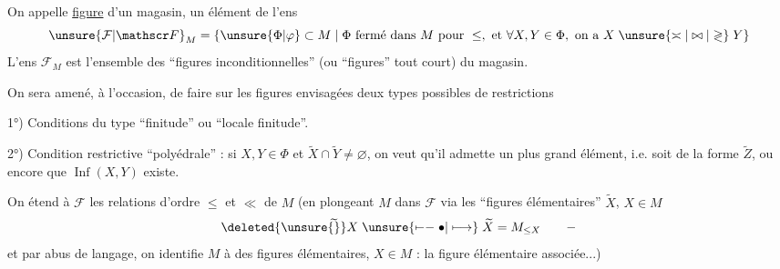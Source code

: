 
On appelle \uline{figure}  d'un magasin, un élément de l'ens
\[
\unsure{\mathcal F|\mathscr F}_M=\{\unsure{\Phi|\varphi}\subset M\mid\Phi\ \text{fermé dans $M$ pour}\ \leq,\ \text{et}\ \forall X,Y\in\Phi,\ \text{on a}\ X\mathrel{\unsure{\asymp|\bowtie|\gtrless}}Y\}
\]
L'ens $\mathcal F_M$ est l'ensemble des ``figures inconditionnelles'' (ou ``figures'' tout court) du magasin.


On sera amené, à l'occasion, de faire sur les figures envisagées deux types possibles de restrictions

1°) Conditions du type ``finitude'' ou ``locale finitude''.


2°) Condition restrictive ``polyédrale'' : si $X,Y\in\Phi$ et $\widetilde X\cap\widetilde Y\ne\varnothing$, on veut qu'il  admette un plus grand élément, i.e. soit de la forme $\widetilde Z$, ou encore que $\operatorname{Inf}(X,Y)$ existe.

On étend à $\mathcal F$ les relations d'ordre $\leq$ et $\ll$ de $M$ (en plongeant $M$ dans $\mathcal F$ via les ``figures élémentaires'' $\widetilde X$, $X\in M$
\[
\deleted{\unsure{\widetilde{\vphantom X}}}X\mathrel{\unsure{\mapstochar\relbar\relbar\bullet|\longmapsto}}\widetilde X=M_{\leq X}\qquad-
\]
 et par abus de langage, on identifie $M$ à  des figures élémentaires, $X\in M$ : la figure élémentaire associée...)


